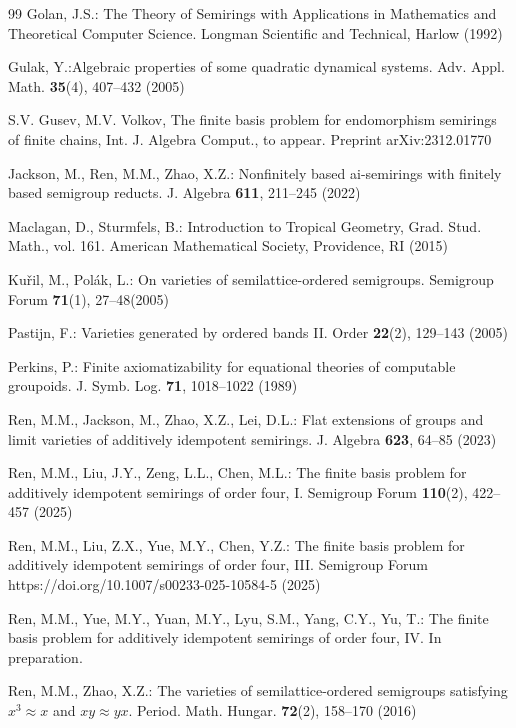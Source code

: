 \documentclass[reqno]{amsart}
\theoremstyle{plain}
\theoremstyle{definition}
\begin{document}
\begin{thebibliography}{99}
Golan, J.S.: The Theory of Semirings with Applications in Mathematics and Theoretical Computer Science.
Longman Scientific and Technical, Harlow (1992)

Gulak, Y.:Algebraic properties of some quadratic dynamical systems. Adv. Appl. Math. \textbf{35}(4), 407–432
(2005)

S.V. Gusev, M.V. Volkov,
The finite basis problem for endomorphism semirings of finite chains,
Int. J. Algebra Comput., to appear. Preprint  arXiv:2312.01770

Jackson, M., Ren, M.M., Zhao, X.Z.: Nonfinitely based
ai-semirings with finitely based semigroup reducts. J. Algebra \textbf{611}, 211--245 (2022)

Maclagan, D., Sturmfels, B.: Introduction to Tropical Geometry, Grad. Stud. Math., vol. 161.
American Mathematical Society, Providence, RI (2015)

 Ku\v{r}il, M., Polák, L.: On varieties of semilattice-ordered semigroups. Semigroup Forum \textbf{71}(1), 27–48(2005)

Pastijn, F.: Varieties generated by ordered bands II. Order \textbf{22}(2), 129--143 (2005)

Perkins, P.: Finite axiomatizability for equational theories of computable groupoids.
J. Symb. Log. \textbf{71}, 1018--1022 (1989)

Ren, M.M., Jackson, M., Zhao, X.Z., Lei, D.L.:
Flat extensions of groups and limit varieties of additively idempotent semirings.
J. Algebra \textbf{623}, 64--85 (2023)

Ren, M.M., Liu, J.Y., Zeng, L.L., Chen, M.L.:
The finite basis problem for additively idempotent semirings of order four, I.
Semigroup Forum {\bf 110}(2), 422--457 (2025)

Ren, M.M., Liu, Z.X., Yue, M.Y., Chen, Y.Z.:
The finite basis problem for additively idempotent semirings of order four, III.
Semigroup Forum https://doi.org/10.1007/s00233-025-10584-5 (2025)

Ren, M.M., Yue, M.Y., Yuan, M.Y., Lyu, S.M., Yang, C.Y., Yu, T.:
The finite basis problem for additively idempotent semirings of order four, IV.
In preparation.

Ren, M.M., Zhao, X.Z.: The varieties of semilattice-ordered semigroups satisfying $x^3\approx x$ and $xy\approx yx$.
Period. Math. Hungar. {\bf 72}(2), 158--170 (2016)


\end{thebibliography}
\end{document}
